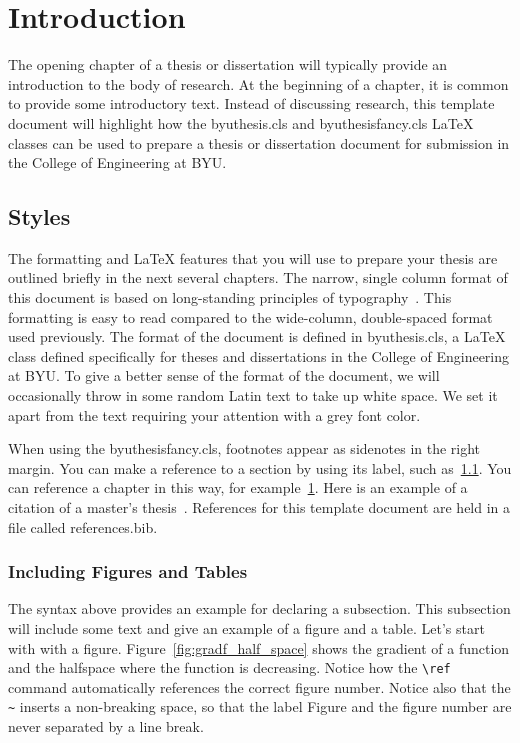 \chapter{Introduction}
\label{ch:intro}

The opening chapter of a thesis or dissertation will typically provide an introduction to the body of research. At the beginning of a chapter, it is common to provide some introductory text. Instead of discussing research, this template document will highlight how the {\ttfamily byuthesis.cls} and {\ttfamily byuthesisfancy.cls} \LaTeX{} classes can be used to prepare a thesis or dissertation document for submission in the College of Engineering at BYU.

\section{Styles}
\label{sec:intro_styles}
The formatting and \LaTeX{} features that you will use to prepare your thesis are outlined briefly in the next several chapters. The narrow, single column format of this document is based on long-standing principles of typography~\autocite{Bringhurst19}. This formatting is easy to read compared to the wide-column, double-spaced format used previously. The format of the document is defined in {\ttfamily byuthesis.cls}, a \LaTeX{} class defined specifically for theses and dissertations in the College of Engineering at BYU. To give a better sense of the format of the document, we will occasionally throw in some random Latin text to take up white space. We set it apart from the text requiring your attention with a grey font color.

\myshorttext

When using the {\ttfamily byuthesisfancy.cls}, footnotes appear as sidenotes in the right margin. You can make a reference to a section by using its label, such as~\cref{sec:intro_styles}. You can reference a chapter in this way, for example~\cref{ch:intro}. Here is an example of a citation of a master's thesis~\autocite{masters1}. References for this template document are held in a file called {\ttfamily references.bib}.

\subsection{Including Figures and Tables}
The syntax above provides an example for declaring a subsection. This subsection will include some text and give an example of a figure and a table. Let's start with with a figure. Figure~\ref{fig:gradf_half_space} shows the gradient of a function and the halfspace where the function is decreasing. Notice how the \verb|\ref| command automatically references the correct figure number. Notice also that the \verb|~| inserts a non-breaking space, so that the label Figure and the figure number are never separated by a line break.

